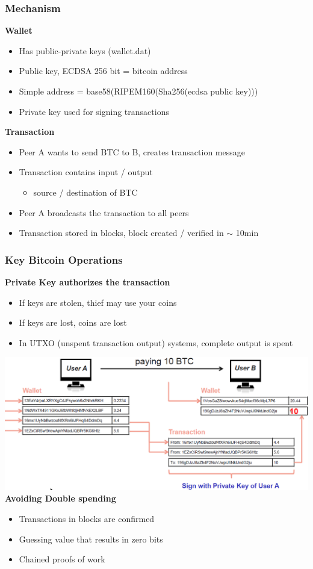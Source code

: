 \subsubsection{Mechanism}
\textbf{Wallet}
\begin{itemize}
    \item Has public-private keys (wallet.dat)
    \item Public key, ECDSA 256 bit = bitcoin address
    \item Simple address = base58(RIPEM160(Sha256(ecdsa public key)))
    \item Private key used for signing transactions
\end{itemize}
\textbf{Transaction}
\begin{itemize}
    \item Peer A wants to send BTC to B, creates transaction message
    \item Transaction contains input / output
    \begin{itemize}
        \item source / destination of BTC
    \end{itemize}
    \item Peer A broadcasts the transaction to all peers
    \item Transaction stored in blocks, block created / verified in $\sim$ 10min
\end{itemize}

\subsubsection{Key Bitcoin Operations}
\textbf{Private Key authorizes the transaction}
\begin{itemize}
    \item If keys are stolen, thief may use your coins
    \item If keys are lost, coins are lost
    \item In UTXO (unspent transaction output) systems, complete output is spent
\end{itemize}
\includegraphics[width=\linewidth]{img/bitcoin_transaction.png}
\textbf{Avoiding Double spending}
\begin{itemize}
    \item Transactions in blocks are confirmed
    \item Guessing value that results in zero bits
    \item Chained proofs of work
\end{itemize}

